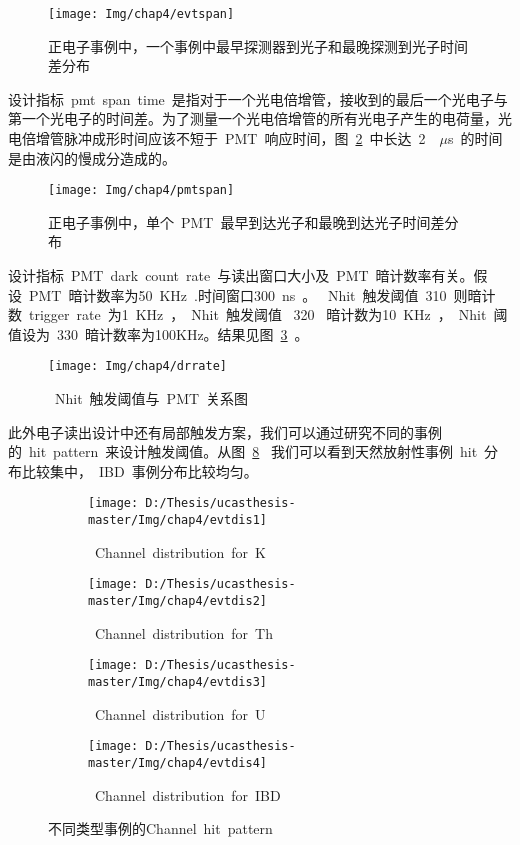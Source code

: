  \begin{figure}[!htbp]
  \centering
   \texttt{[image: Img/chap4/evtspan]}
    \caption{正电子事例中，一个事例中最早探测器到光子和最晚探测到光子时间差分布}
  \label{fig:evtspan}
\end{figure}


 设计指标~pmt~span~time~是指对于一个光电倍增管，接收到的最后一个光电子与第一个光电子的时间差。为了测量一个光电倍增管的所有光电子产生的电荷量，光电倍增管脉冲成形时间应该不短于~PMT~响应时间，图~\ref{fig:pmtspan}~中长达~2~~$\mu$s~的时间是由液闪的慢成分造成的。
 \begin{figure}[!htbp]
  \centering
   \texttt{[image: Img/chap4/pmtspan]}
    \caption{正电子事例中，单个~PMT~最早到达光子和最晚到达光子时间差分布}
  \label{fig:pmtspan}
\end{figure}



 设计指标~PMT~dark~count~rate~与读出窗口大小及~PMT~暗计数率有关。假设~PMT~暗计数率为50~KHz~.时间窗口300~ns~。 ~Nhit~触发阈值~310~则暗计数~trigger~rate~为1~KHz~，~Nhit~触发阈值~
 320 ~暗计数为10~KHz~，~Nhit~阈值设为~330~暗计数率为100KHz。结果见图~\ref{fig:drrate}~。
  \begin{figure}[!htbp]
  \centering
   \texttt{[image: Img/chap4/drrate]}
    \caption{~Nhit~触发阈值与~PMT~关系图}
  \label{fig:drrate}
\end{figure}


 此外电子读出设计中还有局部触发方案，我们可以通过研究不同的事例的~hit~pattern~来设计触发阈值。从图~\ref{fig:evtdis}~ 我们可以看到天然放射性事例~hit~分布比较集中，~IBD~事例分布比较均匀。

 \begin{figure}[!htbp]
  \centering
  \begin{subfigure}[b]{\MySubFactor\textwidth}
    \texttt{[image: D:/Thesis/ucasthesis-master/Img/chap4/evtdis1]}
    \caption{~Channel~distribution~for~K}
    \label{fig:evtdis_1}
  \end{subfigure}%
  \quad\quad\quad\quad\quad\quad%
  \begin{subfigure}[b]{\MySubFactor\textwidth}
    \texttt{[image: D:/Thesis/ucasthesis-master/Img/chap4/evtdis2]}
    \caption{~Channel~distribution~for~Th}
    \label{fig:evtdis_2}
  \end{subfigure}
  \begin{subfigure}[b]{\MySubFactor\textwidth}
    \texttt{[image: D:/Thesis/ucasthesis-master/Img/chap4/evtdis3]}
    \caption{~Channel~distribution~for~U}
    \label{fig:evtdis_3}
  \end{subfigure}%
  \quad\quad\quad\quad\quad\quad%
  \begin{subfigure}[b]{\MySubFactor\textwidth}
    \texttt{[image: D:/Thesis/ucasthesis-master/Img/chap4/evtdis4]}
    \caption{~Channel~distribution~for~IBD}
    \label{fig:evtdis_4}
  \end{subfigure}
  \caption{不同类型事例的Channel~hit~pattern}
  \label{fig:evtdis}
\end{figure}
